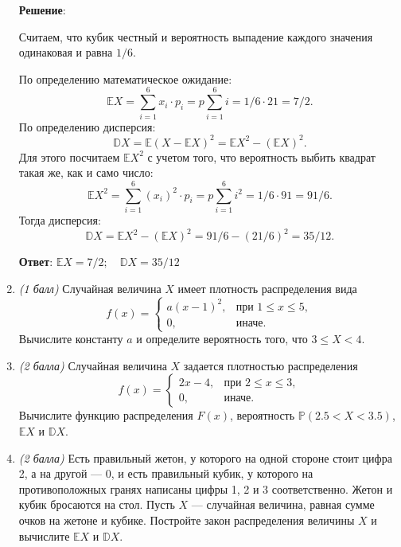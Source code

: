 \documentclass{article}
\begin{document}
\begin{enumerate}
\textbf{Решение}:

Считаем, что кубик честный и вероятность выпадение каждого значения одинаковая и равна $1/6$.

По определению математическое ожидание:
\begin{equation}
    \mathbb{E}X = \sum_{i=1}^{6} x_i \cdot p_i = p \sum_{i=1}^{6} i = 1/6 \cdot 21 = 7/2.
\end{equation}
По определению дисперсия:
\begin{equation}
    \mathbb{D}X = \mathbb{E}(X-\mathbb{E}X)^2 = \mathbb{E}X^2 - (\mathbb{E}X)^2.
\end{equation}
Для этого посчитаем $\mathbb{E}X^2$ с учетом того, что вероятность выбить квадрат такая же, как и само число:
\begin{equation}
    \mathbb{E}X^2 = \sum_{i=1}^{6} (x_i)^2 \cdot p_i = p \sum_{i=1}^{6} i^2 = 1/6 \cdot 91 = 91/6.
\end{equation}
Тогда дисперсия:
\begin{equation}
    \mathbb{D}X = \mathbb{E}X^2 - (\mathbb{E}X)^2 = 91/6 - (21/6)^2 = 35/12.
\end{equation}

\textbf{Ответ}:
$\mathbb{E}X = 7/2; \quad \mathbb{D}X = 35/12$

\item \textit{(1 балл)} Случайная величина $X$ имеет плотность распределения вида
$$f(x)=
\begin{cases}
   a(x-1)^2, &\text{при } 1\leq x\leq5,\\
   0, &\text{иначе}.
 \end{cases}$$
Вычислите константу $a$ и определите вероятность того, что $3\leq X<4$.

\item \textit{(2 балла)} Случайная величина $X$ задается плотностью распределения
$$f(x)=
\begin{cases}
   2x-4, &\text{при } 2\leq x\leq3,\\
   0, &\text{иначе}.
 \end{cases}$$
Вычислите функцию распределения $F(x)$, вероятность $\mathbb{P}(2.5<X<3.5)$, $\mathbb{E}X$ и $\mathbb{D}X$.

\item \textit{(2 балла)} Есть правильный жетон, у которого на одной стороне стоит цифра 2, а на другой --- 0, и есть правильный кубик, у которого на противоположных гранях написаны цифры 1, 2 и 3 соответственно. Жетон и кубик бросаются на стол. Пусть $X$ --- случайная величина, равная сумме очков на жетоне и кубике. Постройте закон распределения величины $X$ и вычислите $\mathbb{E}X$ и $\mathbb{D}X$.



\end{enumerate}
\end{document}
